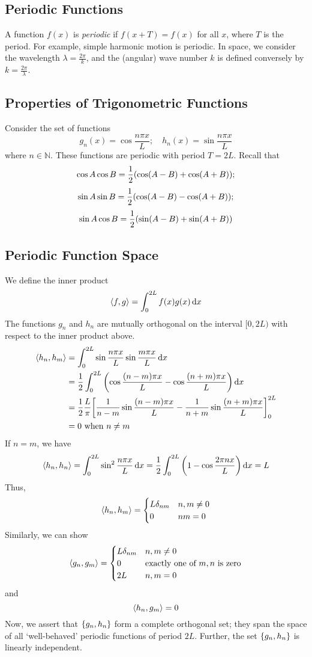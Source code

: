 \subsection{Periodic Functions}
A function \( f(x) \) is \textit{periodic} if \( f(x+T) = f(x) \) for all \( x \), where \( T \) is the period.
For example, simple harmonic motion is periodic.
In space, we consider the wavelength \( \lambda = \frac{2\pi}{k} \), and the (angular) wave number \( k \) is defined conversely by \( k = \frac{2\pi}{\lambda} \).

\subsection{Properties of Trigonometric Functions}
Consider the set of functions
\[ g_n(x) = \cos \frac{n\pi x}{L};\quad h_n(x) = \sin \frac{n\pi x}{L} \]
where \( n \in \mathbb N \).
These functions are periodic with period \( T = 2L \).
Recall that
\[ \cos A \cos B = \frac{1}{2}\qty(\cos(A-B) + \cos(A+B)); \]
\[ \sin A \sin B = \frac{1}{2}\qty(\cos(A-B) - \cos(A+B)); \]
\[ \sin A \cos B = \frac{1}{2}\qty(\sin(A-B) + \sin(A+B)) \]

\subsection{Periodic Function Space}
We define the inner product
\[ \left\langle{f, g}\right\rangle = \int_0^{2L} f(x) g(x) \dd{x} \]
The functions \( g_n \) and \( h_n \) are mutually orthogonal on the interval \( [0, 2L) \) with respect to the inner product above.
\begin{align*}
    \left\langle{h_n, h_m}\right\rangle &= \int_0^{2L} \sin \frac{n\pi x}{L} \sin \frac{m\pi x}{L} \dd{x} \\
    &= \frac{1}{2} \int_0^{2L} \qty(\cos\frac{(n-m)\pi x}{L} - \cos \frac{(n+m)\pi x}{L}) \dd{x} \\
    &= \frac{1}{2} \frac{L}{\pi} \qty[ \frac{1}{n-m}\sin\frac{(n-m)\pi x}{L} - \frac{1}{n+m} \sin \frac{(n+m)\pi x}{L} ]_0^{2L} \\
    &= 0 \text{ when } n \neq m
\end{align*}
If \( n = m \), we have
\[ \left\langle{h_n, h_n}\right\rangle = \int_0^{2L} \sin^2 \frac{n\pi x}{L} \dd{x} = \frac{1}{2} \int_0^{2L} \qty(1-\cos \frac{2\pi n x}{L}) \dd{x} = L \]
Thus,
\[ \left\langle{h_n, h_m}\right\rangle = \begin{cases}
    L \delta_{nm} & n,m \neq 0 \\
    0 & nm = 0
\end{cases} \]
Similarly, we can show
\[ \left\langle{g_n, g_m}\right\rangle = \begin{cases}
    L \delta_{nm} & n,m \neq 0 \\
    0 & \text{exactly one of } m,n \text{ is zero} \\
    2L & n,m = 0
\end{cases} \]
and
\[ \left\langle{h_n, g_m}\right\rangle = 0 \]
Now, we assert that \( \qty{g_n, h_n} \) form a complete orthogonal set; they span the space of all `well-behaved' periodic functions of period \( 2L \).
Further, the set \( \qty{g_n, h_n} \) is linearly independent.

